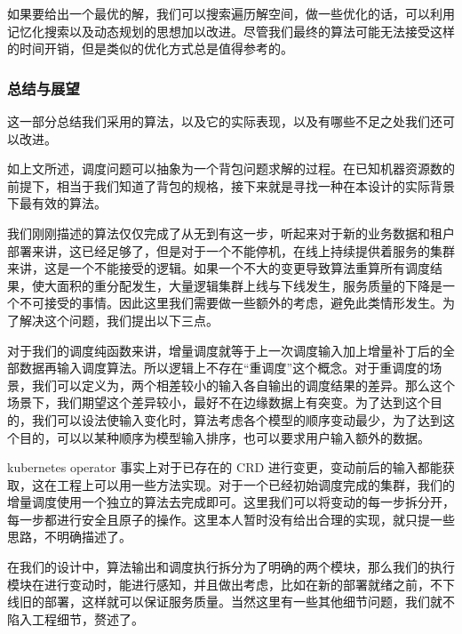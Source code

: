如果要给出一个最优的解，我们可以搜索遍历解空间，做一些优化的话，可以利用记忆化搜索以及动态规划的思想加以改进。尽管我们最终的算法可能无法接受这样的时间开销，但是类似的优化方式总是值得参考的。

\subsubsection{总结与展望}

这一部分总结我们采用的算法，以及它的实际表现，以及有哪些不足之处我们还可以改进。


如上文所述，调度问题可以抽象为一个背包问题求解的过程。在已知机器资源数的前提下，相当于我们知道了背包的规格，接下来就是寻找一种在本设计的实际背景下最有效的算法。



我们刚刚描述的算法仅仅完成了从无到有这一步，听起来对于新的业务数据和租户部署来讲，这已经足够了，但是对于一个不能停机，在线上持续提供着服务的集群来讲，这是一个不能接受的逻辑。如果一个不大的变更导致算法重算所有调度结果，使大面积的重分配发生，大量逻辑集群上线与下线发生，服务质量的下降是一个不可接受的事情。因此这里我们需要做一些额外的考虑，避免此类情形发生。为了解决这个问题，我们提出以下三点。


对于我们的调度纯函数来讲，增量调度就等于上一次调度输入加上增量补丁后的全部数据再输入调度算法。所以逻辑上不存在“重调度”这个概念。对于重调度的场景，我们可以定义为，两个相差较小的输入各自输出的调度结果的差异。那么这个场景下，我们期望这个差异较小，最好不在边缘数据上有突变。为了达到这个目的，我们可以设法使输入变化时，算法考虑各个模型的顺序变动最少，为了达到这个目的，可以以某种顺序为模型输入排序，也可以要求用户输入额外的数据。


kubernetes operator 事实上对于已存在的 CRD 进行变更，变动前后的输入都能获取，这在工程上可以用一些方法实现。对于一个已经初始调度完成的集群，我们的增量调度使用一个独立的算法去完成即可。这里我们可以将变动的每一步拆分开，每一步都进行安全且原子的操作。这里本人暂时没有给出合理的实现，就只提一些思路，不明确描述了。



在我们的设计中，算法输出和调度执行拆分为了明确的两个模块，那么我们的执行模块在进行变动时，能进行感知，并且做出考虑，比如在新的部署就绪之前，不下线旧的部署，这样就可以保证服务质量。当然这里有一些其他细节问题，我们就不陷入工程细节，赘述了。

